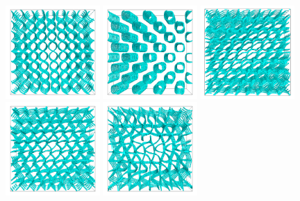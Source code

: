 \documentclass[aps,pre,reprint,superscriptaddress]{revtex4}
\begin{document}
\begin{figure}[h]
\includegraphics[width=0.32\textwidth]{disc-xy-400k_run1115.png}
\includegraphics[width=0.32\textwidth]{disc-yz-400k_run1115.png}
\includegraphics[width=0.32\textwidth]{disc-xy-725k_run1115.png}\\
\includegraphics[width=0.32\textwidth]{disc-xy-750k_run1115.png}
\includegraphics[width=0.32\textwidth]{disc-xy-1700k_run1115.png}

\end{figure}
\end{document}
